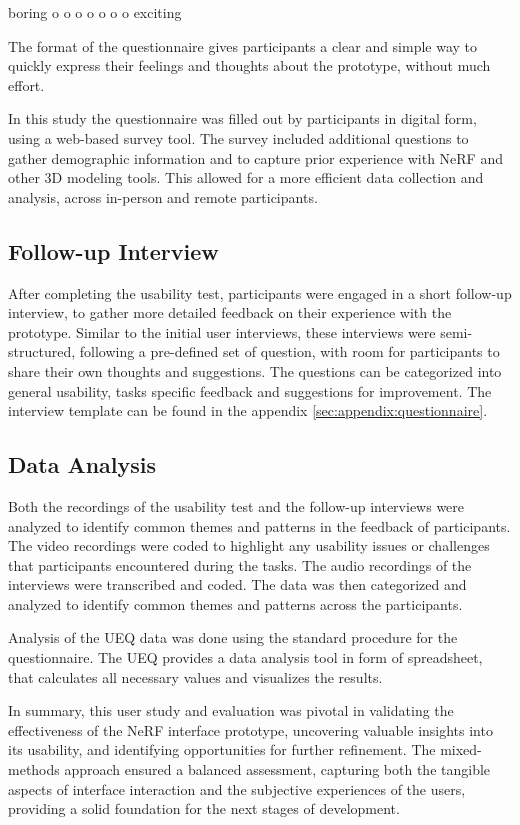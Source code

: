 \begin{center}
  boring \quad o o o o o o o \quad exciting
\end{center}

The format of the questionnaire gives participants a clear and simple way to  quickly express their feelings and thoughts about the prototype, without much effort.

In this study the questionnaire was filled out by participants in digital form, using a web-based survey tool. %
The survey included additional questions to gather demographic information and to capture prior experience with NeRF and other 3D modeling tools.
This allowed for a more efficient data collection and analysis, across in-person and remote participants.

\subsection*{Follow-up Interview}
\label{sec:methodology:study:interview}

After completing the usability test, participants were engaged in a short follow-up interview, to gather more detailed feedback on their experience with the prototype. 
Similar to the initial user interviews, these interviews were semi-structured, following a pre-defined set of question, with room for participants to share their own thoughts and suggestions.
The questions can be categorized into general usability, tasks specific feedback and suggestions for improvement.
The interview template can be found in the appendix \ref{sec:appendix:questionnaire}.


\subsection*{Data Analysis}
\label{sec:methodology:study:analysis}

Both the recordings of the usability test and the follow-up interviews were analyzed to identify common themes and patterns in the feedback of participants.
The video recordings were coded to highlight any usability issues or challenges that participants encountered during the tasks.
The audio recordings of the interviews were transcribed and coded.
The data was then categorized and analyzed to identify common themes and patterns across the participants.

Analysis of the UEQ data was done using the standard procedure for the questionnaire.
The UEQ provides a data analysis tool in form of spreadsheet, that calculates all necessary values and visualizes the results.

In summary, this user study and evaluation was pivotal in validating the effectiveness of the NeRF interface prototype, uncovering valuable insights into its usability, and identifying opportunities for further refinement. 
The mixed-methods approach ensured a balanced assessment, capturing both the tangible aspects of interface interaction and the subjective experiences of the users, providing a solid foundation for the next stages of development.